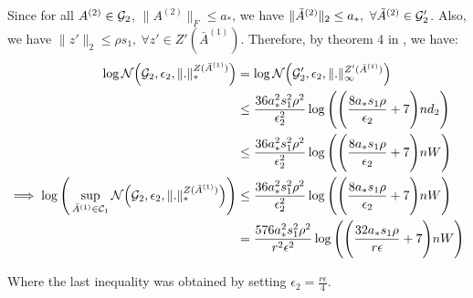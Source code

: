 \noindent Since for all $A^{(2)}\in \mathcal{G}_2$, $\|A^{(2)}\|_F\le a_*$, we have $\|\tilde A^{(2)}\|_2\le a_*, \ \forall \tilde A^{(2)} \in \G_2'$. Also, we have $\|z'\|_2\le \rho s_1, \ \forall z'\in Z'(\bar A^{(1)})$. Therefore, by theorem 4 in \cite{article:tong_zhang}, we have:
\begin{align*}
    \log\mathcal{N}\Big( \mathcal{G}_2, \epsilon_2, \|.\|_*^{Z(\bar A^{(1)})} \Big) &= \log\mathcal{N}\Big( \mathcal{G}_2', \epsilon_2, \|.\|_\infty^{Z'(\bar A^{(1)})} \Big) \\
        &\le \frac{36a_*^2s_1^2\rho^2}{\epsilon_2^2} \log\Bigg( 
            \Bigg( 
                \frac{8a_*s_1\rho}{\epsilon_2} + 7
             \Bigg)nd_2
         \Bigg) \\
        &\le \frac{36a_*^2s_1^2\rho^2}{\epsilon_2^2} \log\Bigg( 
            \Bigg( 
                \frac{8a_*s_1\rho}{\epsilon_2} + 7
             \Bigg)nW
         \Bigg) \\
    \implies 
    \log\Bigg( 
        \sup_{\bar A^{(1)} \in \mathcal{C}_1} \mathcal{N}\Big( \mathcal{G}_2, \epsilon_2, \|.\|_*^{Z(\bar A^{(1)})} \Big)
     \Bigg) &\le \frac{36a_*^2s_1^2\rho^2}{\epsilon_2^2} \log\Bigg( 
        \Bigg( 
            \frac{8a_*s_1\rho}{\epsilon_2} + 7
         \Bigg)nW
     \Bigg) \\
    &= \frac{576a_*^2s_1^2\rho^2}{r^2\epsilon^2} \log\Bigg( 
        \Bigg( 
            \frac{32a_*s_1\rho}{r\epsilon} + 7
         \Bigg)nW
     \Bigg)
\end{align*}

\noindent Where the last inequality was obtained by setting $\epsilon_2=\frac{r\epsilon}{4}$.


